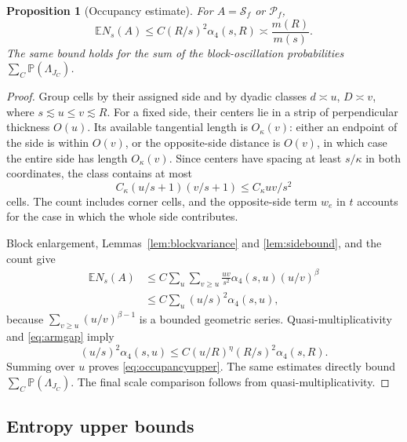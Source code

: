 \documentclass[11pt]{amsart}
\newtheorem{proposition}[theorem]{Proposition}
\theoremstyle{remark}
\newcommand{\Prob}{\mathbb P}
\newcommand{\E}{\mathbb E}
\newcommand{\cS}{\mathcal S}
\newcommand{\cP}{\mathcal P}
\begin{document}
\begin{proposition}[Occupancy estimate]\label{prop:occupancy}
For $A=\cS_f$ or $\cP_f$,
\begin{equation}\label{eq:occupancyupper}
 \E N_s(A)\le C(R/s)^2\alpha_4(s,R)
 \asymp\frac{m(R)}{m(s)}.
\end{equation}
The same bound holds for the sum of the block-oscillation probabilities $\sum_C\Prob(\Lambda_{J_C})$.
\end{proposition}
\begin{proof}
Group cells by their assigned side and by dyadic classes $d\asymp u$, $D\asymp v$, where $s\lesssim u\le v\lesssim R$. For a fixed side, their centers lie in a strip of perpendicular thickness $O(u)$. Its available tangential length is $O_\kappa(v)$: either an endpoint of the side is within $O(v)$, or the opposite-side distance is $O(v)$, in which case the entire side has length $O_\kappa(v)$. Since centers have spacing at least $s/\kappa$ in both coordinates, the class contains at most
\[
 C_\kappa(u/s+1)(v/s+1)\le C_\kappa uv/s^2
\]
cells. The count includes corner cells, and the opposite-side term $w_e$ in $t$ accounts for the case in which the whole side contributes.

Block enlargement, Lemmas~\ref{lem:blockvariance} and \ref{lem:sidebound}, and the count give
\begin{align*}
 \E N_s(A)
 &\le C\sum_u\sum_{v\ge u}\frac{uv}{s^2}\alpha_4(s,u)(u/v)^\beta\\
 &\le C\sum_u(u/s)^2\alpha_4(s,u),
\end{align*}
because $\sum_{v\ge u}(u/v)^{\beta-1}$ is a bounded geometric series. Quasi-multiplicativity and \eqref{eq:armgap} imply
\[
 (u/s)^2\alpha_4(s,u)
 \le C(u/R)^\eta (R/s)^2\alpha_4(s,R).
\]
Summing over $u$ proves \eqref{eq:occupancyupper}. The same estimates directly bound $\sum_C\Prob(\Lambda_{J_C})$. The final scale comparison follows from quasi-multiplicativity.
\end{proof}

\subsection{Entropy upper bounds}
\end{document}
